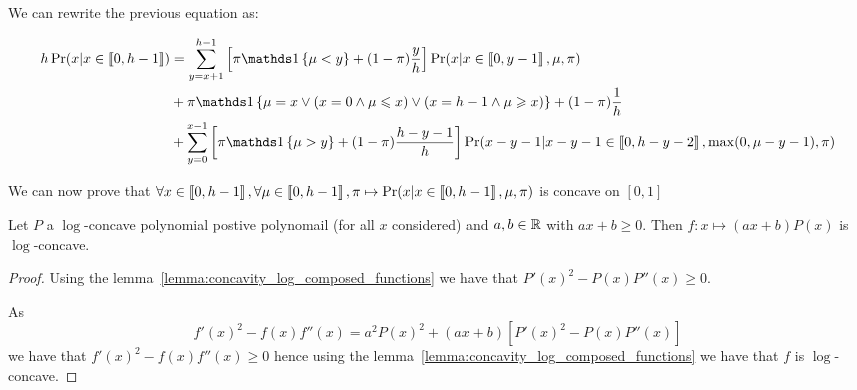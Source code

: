 We can rewrite the previous equation as:

\begin{align}
    h\Pr(x | x \in \bbrack{0, h - 1})
    &= \sum_{y = x + 1}^{h - 1} \left[ \pi \indickronecker{\mu < y} + (1-\pi) \frac{y}{h} \right] \Pr(x | x \in \bbrack{0, y - 1}, \mu, \pi) \\
    &+ \pi \indickronecker{\mu = x \lor (x = 0 \land \mu \leq x) \lor (x = h - 1 \land \mu \geq x)} + (1 - \pi) \frac{1}{h} \\
    &+ \sum_{y = 0}^{x - 1} \left[ \pi \indickronecker{\mu > y} + (1-\pi) \frac{h - y - 1}{h} \right] \Pr(x - y - 1 | x - y - 1 \in \bbrack{0, h - y - 2}, \max(0, \mu - y - 1), \pi)
\end{align}


We can now prove that $\forall x \in \left\llbracket0, h - 1\right\rrbracket, \forall \mu \in \left\llbracket0, h - 1\right\rrbracket, \pi \mapsto \Pr(x | x \in \left\llbracket0, h - 1\right\rrbracket, \mu, \pi)$ is concave on $[0, 1]$


\begin{lemma}
    \label{lemma:concavity_log_polynomial_times_affine}
    Let $P$ a $\log$-concave polynomial postive polynomail (for all $x$ considered) and $a, b \in \mathbb{R}$ with $ax + b \geq 0$. Then $f: x \mapsto (ax + b)P(x)$ is $\log$-concave.
\end{lemma}
\begin{proof}
    Using the lemma~\ref{lemma:concavity_log_composed_functions} we have that $P'(x)^2 - P(x)P''(x) \geq 0$.
    
    As
    \[f'(x)^2 - f(x) f''(x) = a^2 P(x)^2 + (ax + b) \left[ P'(x)^2 - P(x)P''(x) \right] \] 
    we have that $f'(x)^2 - f(x) f''(x) \geq 0$ hence using the lemma~\ref{lemma:concavity_log_composed_functions} we have that $f$ is $\log$-concave.
\end{proof}


